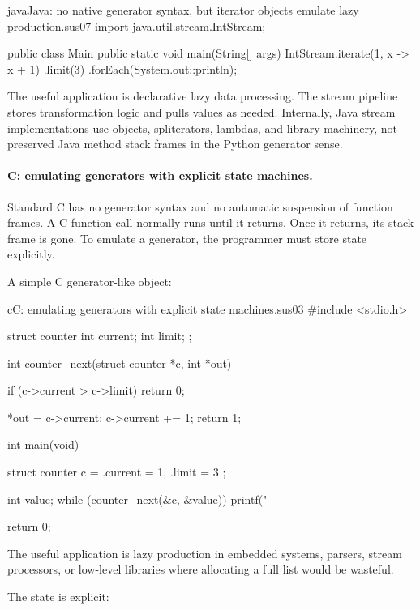 \begin{codebox}[]{java}{Java: no native generator syntax, but iterator objects emulate lazy production.}{sus07}
import java.util.stream.IntStream;

public class Main {
    public static void main(String[] args) {
        IntStream.iterate(1, x -> x + 1)
                 .limit(3)
                 .forEach(System.out::println);
    }
}
\end{codebox}


The useful application is declarative lazy data processing. The stream pipeline stores transformation logic and pulls values as needed. Internally, Java stream implementations use objects, spliterators, lambdas, and library machinery, not preserved Java method stack frames in the Python generator sense.

\paragraph{C: emulating generators with explicit state machines.}

Standard C has no generator syntax and no automatic suspension of function frames. A C function call normally runs until it returns. Once it returns, its stack frame is gone. To emulate a generator, the programmer must store state explicitly.

A simple C generator-like object:

\begin{codebox}[]{c}{C: emulating generators with explicit state machines.}{sus03}
#include <stdio.h>

struct counter {
    int current;
    int limit;
};

int counter_next(struct counter *c, int *out) {
    if (c->current > c->limit) {
        return 0;
    }

    *out = c->current;
    c->current += 1;
    return 1;
}

int main(void) {
    struct counter c = { .current = 1, .limit = 3 };

    int value;
    while (counter_next(&c, &value)) {
        printf("%
    }

    return 0;
}
\end{codebox}


The useful application is lazy production in embedded systems, parsers, stream processors, or low-level libraries where allocating a full list would be wasteful.

The state is explicit:

